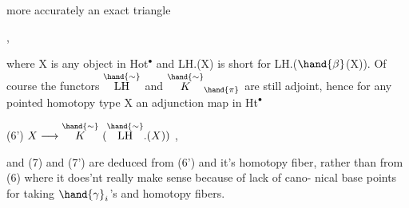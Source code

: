 more accurately an exact triangle

   \qquad ,

where X is any object in Hot$^\bullet$ and LH.(X) is short for LH.($\hand{\beta}$(X)). Of
course the functors $\overset{\hand{\sim}}{\mathrm{LH}}$ and $\overset{\hand{\sim}}{K}_{\hand{\pi}}$ are still adjoint, hence for any pointed
homotopy type X an adjunction map in Ht$^\bullet$

(6') \qquad $X \longrightarrow \overset{\hand{\sim}}{K}\ (\overset{\hand{\sim}}{\mathrm{LH}}.(X))$ \quad ,

and (7) and (7') are deduced from (6') and it's homotopy fiber, rather
than from (6) where it does'nt really make sense because of lack of cano-%
nical base points for taking $\hand{\gamma}_i$'s and homotopy fibers.


